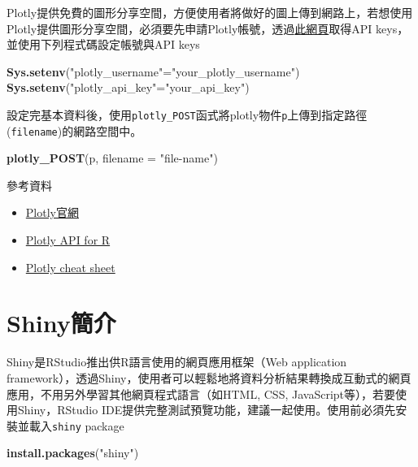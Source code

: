 \documentclass[]{book}
\newenvironment{Shaded}{\begin{snugshade}}{\end{snugshade}}
\newcommand{\KeywordTok}[1]{\textcolor[rgb]{0.13,0.29,0.53}{\textbf{{#1}}}}
\newcommand{\DataTypeTok}[1]{\textcolor[rgb]{0.13,0.29,0.53}{{#1}}}
\newcommand{\StringTok}[1]{\textcolor[rgb]{0.31,0.60,0.02}{{#1}}}
\newcommand{\NormalTok}[1]{{#1}}
\providecommand{\tightlist}{%
  \setlength{\itemsep}{0pt}\setlength{\parskip}{0pt}}
\theoremstyle{definition}
\theoremstyle{definition}
\theoremstyle{remark}
\begin{document}
\hypertarget{htmlwidget-32c5516a2db5c033e43b}{}

Plotly提供免費的圖形分享空間，方便使用者將做好的圖上傳到網路上，若想使用Plotly提供圖形分享空間，必須要先申請Plotly帳號，透過\href{https://plot.ly/settings/api}{此網頁}取得API
keys，並使用下列程式碼設定帳號與API keys

\begin{Shaded}
\begin{Highlighting}[]
\KeywordTok{Sys.setenv}\NormalTok{(}\StringTok{"plotly_username"}\NormalTok{=}\StringTok{"your_plotly_username"}\NormalTok{)}
\KeywordTok{Sys.setenv}\NormalTok{(}\StringTok{"plotly_api_key"}\NormalTok{=}\StringTok{"your_api_key"}\NormalTok{)}
\end{Highlighting}
\end{Shaded}

設定完基本資料後，使用\texttt{plotly\_POST}函式將plotly物件\texttt{p}上傳到指定路徑(\texttt{filename})的網路空間中。

\begin{Shaded}
\begin{Highlighting}[]
\KeywordTok{plotly_POST}\NormalTok{(p, }\DataTypeTok{filename =} \StringTok{"file-name"}\NormalTok{)}
\end{Highlighting}
\end{Shaded}

參考資料

\begin{itemize}
\tightlist
\item
  \href{https://plot.ly/}{Plotly官網}
\item
  \href{https://plot.ly/r/}{Plotly API for R}
\item
  \href{https://images.plot.ly/plotly-documentation/images/r_cheat_sheet.pdf}{Plotly
  cheat sheet}
\end{itemize}

\section{Shiny簡介}\label{shiny}

Shiny是RStudio推出供R語言使用的網頁應用框架（Web application
framework），透過Shiny，使用者可以輕鬆地將資料分析結果轉換成互動式的網頁應用，不用另外學習其他網頁程式語言（如HTML,
CSS, JavaScript等），若要使用Shiny，RStudio
IDE提供完整測試預覽功能，建議一起使用。使用前必須先安裝並載入\texttt{shiny}
\citep{R-shiny} package

\begin{Shaded}
\begin{Highlighting}[]
\KeywordTok{install.packages}\NormalTok{(}\StringTok{"shiny"}\NormalTok{)}
\end{Highlighting}
\end{Shaded}
\end{document}
